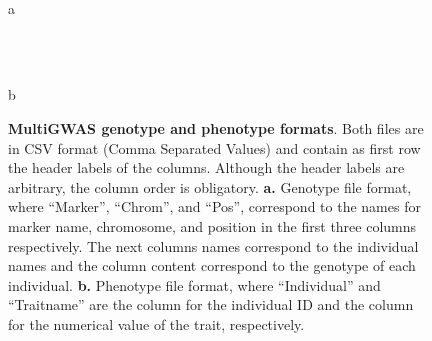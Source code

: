 \documentclass{article}
\begin{document}
\begin{figure}[H]
\begin{centering}
\begin{minipage}[t]{0.6\columnwidth}%
\begin{center}
\\
a
\par\end{center}%
\end{minipage}~~~~~~~~~%
\begin{minipage}[t]{0.3\columnwidth}%
\begin{center}
\\
b
\par\end{center}%
\end{minipage}
\par\end{centering}
\begin{centering}
\par\end{centering}

\caption{\scriptsize \textbf{MultiGWAS genotype and phenotype formats}. Both files are in CSV format (Comma Separated Values) and contain as first row the header labels of the columns. Although the header labels are arbitrary, the column order is obligatory. \textbf{a.} Genotype file format, where ``Marker'', ``Chrom'', and ``Pos'', correspond to the names for marker name, chromosome, and position in the first three columns respectively. The next columns names correspond to the individual names and the column content correspond to the genotype of each individual. \textbf{b.} Phenotype file format, where ``Individual'' and ``Traitname'' are the column for the individual ID and the column for the numerical value of the trait, respectively.\label{fig:File-Formats}}
\end{figure}
\end{document}
